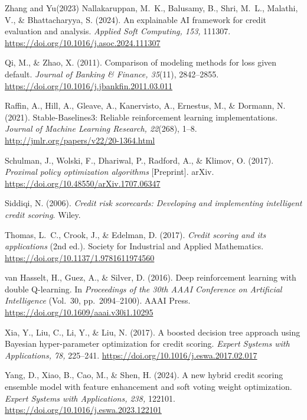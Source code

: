 \documentclass[preprint,review,authoryear,12pt]{elsarticle}
\begin{document}
\begin{thebibliography}{Zhang and Yu(2023)}
    Nallakaruppan, M.~K., Balusamy, B., Shri, M.~L., Malathi, V., \& Bhattacharyya, S. (2024).
    An explainable AI framework for credit evaluation and analysis.
    \textit{Applied Soft Computing, 153,} 111307.
    \url{https://doi.org/10.1016/j.asoc.2024.111307}

    Qi, M., \& Zhao, X. (2011).
    Comparison of modeling methods for loss given default.
    \textit{Journal of Banking \& Finance, 35}(11), 2842--2855.
    \url{https://doi.org/10.1016/j.jbankfin.2011.03.011}

    Raffin, A., Hill, A., Gleave, A., Kanervisto, A., Ernestus, M., \& Dormann, N. (2021).
    Stable-Baselines3: Reliable reinforcement learning implementations.
    \textit{Journal of Machine Learning Research, 22}(268), 1--8.
    \url{http://jmlr.org/papers/v22/20-1364.html}

    Schulman, J., Wolski, F., Dhariwal, P., Radford, A., \& Klimov, O. (2017).
    \textit{Proximal policy optimization algorithms} [Preprint]. arXiv.
    \url{https://doi.org/10.48550/arXiv.1707.06347}

    Siddiqi, N. (2006).
    \textit{Credit risk scorecards: Developing and implementing intelligent credit scoring}. Wiley.

    Thomas, L.~C., Crook, J., \& Edelman, D. (2017).
    \textit{Credit scoring and its applications} (2nd ed.).
    Society for Industrial and Applied Mathematics.
    \url{https://doi.org/10.1137/1.9781611974560}

    van Hasselt, H., Guez, A., \& Silver, D. (2016).
    Deep reinforcement learning with double Q-learning. In \textit{Proceedings of the 30th
        AAAI Conference on Artificial Intelligence} (Vol.~30, pp.~2094--2100). AAAI Press.
    \url{https://doi.org/10.1609/aaai.v30i1.10295}

    Xia, Y., Liu, C., Li, Y., \& Liu, N. (2017).
    A boosted decision tree approach using Bayesian hyper-parameter optimization for credit scoring.
    \textit{Expert Systems with Applications, 78,} 225--241.
    \url{https://doi.org/10.1016/j.eswa.2017.02.017}

    Yang, D., Xiao, B., Cao, M., \& Shen, H. (2024).
    A new hybrid credit scoring ensemble model with feature enhancement and soft voting weight optimization.
    \textit{Expert Systems with Applications, 238,} 122101.
    \url{https://doi.org/10.1016/j.eswa.2023.122101}


\end{thebibliography}
\end{document}
